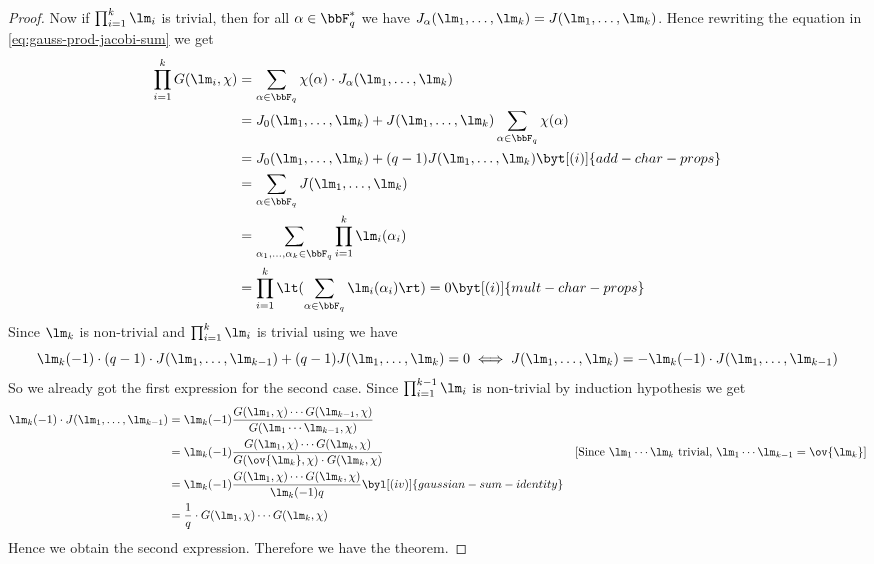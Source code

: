 \begin{proof}
  Now if $\prod_{i=1}^k\lm_i$ is trivial, then for all $\alpha\in\bbF_q^*$ we have $J_{\alpha}(\lm_1,\dots,\lm_k)=J(\lm_1,\dots, \lm_k)$. Hence rewriting the equation in \eqref{eq:gauss-prod-jacobi-sum} we get \begin{align*}
    \prod_{i=1}^k G(\lm_i,\chi)& =\sum_{\alpha\in\bbF_q}\chi(\alpha)\cdot J_{\alpha}(\lm_1,\dots,\lm_k)\\ 
    & = J_0(\lm_1,\dots,\lm_k)+J(\lm_1,\dots,\lm_k)\sum_{\alpha\in\bbF_q}\chi(\alpha)\\ 
    & = J_0(\lm_1,\dots,\lm_k)+(q-1)J(\lm_1,\dots,\lm_k) \byt[(i)]{add-char-props}\\ 
    & = \sum_{\alpha\in\bbF_q}J(\lm_1,\dots,\lm_k)\\ 
    & = \sum_{\alpha_1,\dots,\alpha_k\in\bbF_q}\prod_{i=1}^k\lm_i(\alpha_i)\\ 
    & = \prod_{i=1}^k \lt(\sum_{\alpha\in\bbF_q}\lm_i(\alpha_i)\rt)=0\byt[(i)]{mult-char-props}
  \end{align*} Since $\lm_k$ is non-trivial and $\prod_{i=1}^k\lm_i$ is trivial using   we have  $$\lm_k(-1)\cdot (q-1)\cdot J(\lm_1,\dots,\lm_{k-1})+(q-1)J(\lm_1,\dots, \lm_k)=0\iff J(\lm_1,\dots, \lm_k)=-\lm_k(-1)\cdot J(\lm_1,\dots,\lm_{k-1})$$So we already got the first expression for the second case. Since $\prod_{i=1}^{k-1}\lm_i$ is non-trivial by induction hypothesis we get \begin{align*}
    \lm_k(-1)\cdot J(\lm_1,\dots,\lm_{k-1})& = \lm_k(-1)\frac{G(\lm_1,\chi)\cdots G(\lm_{k-1},\chi)}{G(\lm_1\cdots\lm_{k-1},\chi)}\\ 
    & = \lm_k(-1)\frac{G(\lm_1,\chi)\cdots G(\lm_{k},\chi)}{G(\ov{\lm_k},\chi)\cdot G(\lm_k,\chi)}& [\text{Since }\lm_1\cdots\lm_k\text{ trivial, } \lm_1\cdots\lm_{k-1}=\ov{\lm_k}]\\ 
    & = \lm_k(-1)\frac{G(\lm_1,\chi)\cdots G(\lm_{k},\chi)}{\lm_k(-1)q}\byl[(iv)]{gaussian-sum-identity}\\ 
    & = \frac1q\cdot G(\lm_1,\chi)\cdots G(\lm_{k},\chi)
  \end{align*}
  Hence we obtain the second expression. Therefore we have the theorem. 
\end{proof}

